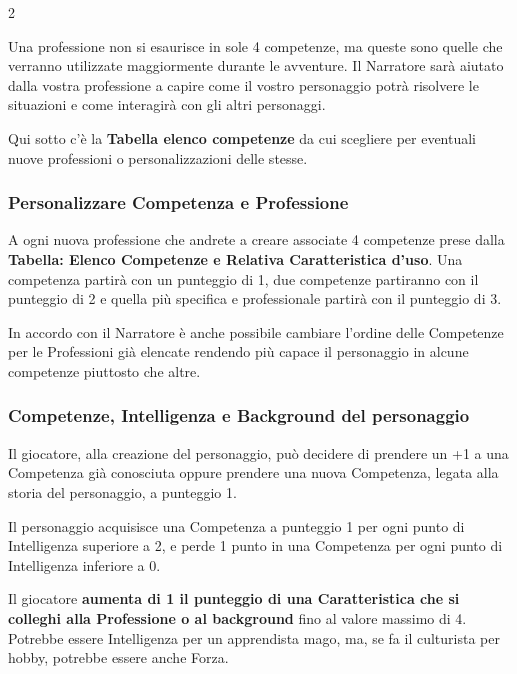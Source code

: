 \begin{multicols}{2}

Una professione non si esaurisce in sole 4 competenze, ma queste sono quelle che verranno utilizzate maggiormente durante le avventure. Il Narratore sarà aiutato dalla vostra professione a capire come il vostro personaggio potrà risolvere le situazioni e come interagirà con gli altri personaggi.

Qui sotto c'è la \textbf{Tabella elenco competenze} da cui scegliere per eventuali nuove professioni o personalizzazioni delle stesse.

\subsubsection{Personalizzare Competenza e Professione}

A ogni nuova professione che andrete a creare associate 4 competenze prese dalla \textbf{Tabella: Elenco Competenze e Relativa Caratteristica d'uso}. Una competenza partirà con un punteggio di 1, due competenze partiranno con il punteggio di 2 e quella più specifica e professionale partirà con il punteggio di 3.

In accordo con il Narratore è anche possibile cambiare l'ordine delle Competenze per le Professioni già elencate rendendo più capace il personaggio in alcune competenze piuttosto che altre.

\subsubsection{Competenze, Intelligenza e Background del personaggio}\label{quintacompetenza}

Il giocatore, alla creazione del personaggio, può decidere di prendere un +1 a una Competenza già conosciuta oppure prendere una nuova Competenza, legata alla storia del personaggio, a punteggio 1.

Il personaggio acquisisce una Competenza a punteggio 1 per ogni punto di Intelligenza superiore a 2, e perde 1 punto in una Competenza per ogni punto di Intelligenza inferiore a 0.

\medskip

Il giocatore \textbf{aumenta di 1 il punteggio di una Caratteristica che si colleghi alla Professione o al background} fino al valore massimo di 4. Potrebbe essere Intelligenza per un apprendista mago, ma, se fa il culturista per hobby, potrebbe essere anche Forza.


\end{multicols}
